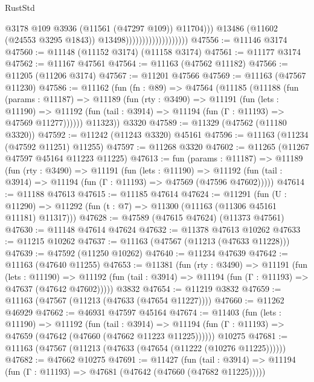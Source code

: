 \begin{lexlean}{RustStd}
\begin{coremodule}
                                                @3178
                                                @109
                                                @3936
                                                (@11561 (@47297 @109))
                                                @11704)))
                                          @13486
                                          (@11602 (@24553 @3295 @1843))
                                          @13498)))))))))))))))))))
@47556 := @11146 @3174
@47560 := @11148 (@11152 @3174) (@11158 @3174)
@47561 := @11177 @3174
@47562 := @11167 @47561
@47564 := @11163 (@47562 @11182)
@47566 := @11205 (@11206 @3174)
@47567 := @11201 @47566
@47569 := @11163 (@47567 @11230)
@47586 := @11162
    (fun (fn : @89) =>
    @47564
      (@11185
        (@11188
          (fun (params : @11187) =>
          @11189
            (fun (rty : @3490) =>
            @11191
              (fun (lets : @11190) =>
              @11192 (fun (tail : @3914) => @11194 (fun (Γ : @11193) => @47569 @11277))))))
        @11323))
    @3320
@47589 := @11329 (@47562 (@11180 @3320))
@47592 := @11242 (@11243 @3320) @45161
@47596 := @11163 (@11234 (@47592 @11251) @11255)
@47597 := @11268 @3320
@47602 := @11265 (@11267 @47597 @45164 @11223 @11225)
@47613 := fun (params : @11187) =>
  @11189
    (fun (rty : @3490) =>
    @11191
      (fun (lets : @11190) =>
      @11192 (fun (tail : @3914) => @11194 (fun (Γ : @11193) => @47569 (@47596 @47602)))))
@47614 := @11188 @47613
@47615 := @11185 @47614
@47624 := @11291
    (fun (U : @11290) => @11292 (fun (t : @7) => @11300 (@11163 (@11306 @45161 @11181) @11317)))
@47628 := @47589 (@47615 @47624) (@11373 @47561)
@47630 := @11148 @47614 @47624
@47632 := @11378 @47613 @10262
@47633 := @11215 @10262
@47637 := @11163 (@47567 (@11213 (@47633 @11228)))
@47639 := @47592 (@11250 @10262)
@47640 := @11234 @47639
@47642 := @11163 (@47640 @11255)
@47653 := @11381
    (fun (rty : @3490) =>
    @11191
      (fun (lets : @11190) =>
      @11192 (fun (tail : @3914) => @11194 (fun (Γ : @11193) => @47637 (@47642 @47602)))))
    @3832
@47654 := @11219 @3832
@47659 := @11163 (@47567 (@11213 (@47633 (@47654 @11227))))
@47660 := @11262 @46929
@47662 := @46931 @47597 @45164
@47674 := @11403
    (fun (lets : @11190) =>
    @11192
      (fun (tail : @3914) =>
      @11194 (fun (Γ : @11193) => @47659 (@47642 (@47660 (@47662 @11223 @11225))))))
    @10275
@47681 := @11163 (@47567 (@11213 (@47633 (@47654 (@11222 (@10276 @11225))))))
@47682 := @47662 @10275
@47691 := @11427
    (fun (tail : @3914) => @11194 (fun (Γ : @11193) => @47681 (@47642 (@47660 (@47682 @11225)))))

\end{coremodule}
\end{lexlean}
